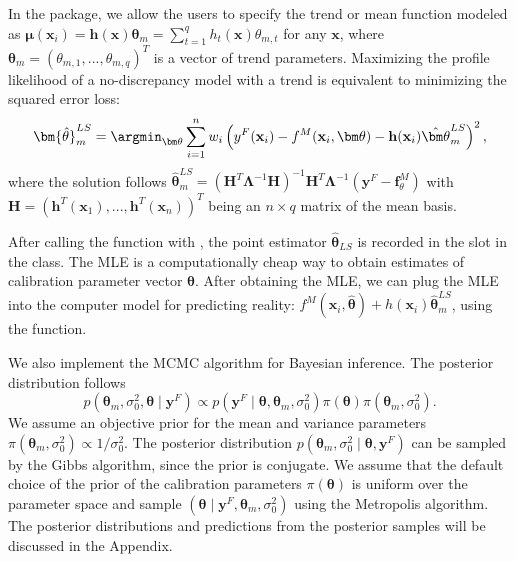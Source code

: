   In the  package, we allow the users to specify the trend or mean function modeled as $\bm \mu(\mathbf x_i)=  \mathbf h(\mathbf x) \bm \theta_{m}=\sum^q_{t=1}h_t(\mathbf x)  \theta_{m,t} $ for any $\mathbf x$, where $\bm \theta_{m}=(\theta_{m,1},...,\theta_{m,q})^T$ is a vector of trend parameters. Maximizing the profile likelihood of a no-discrepancy model with a trend is equivalent to minimizing the squared error loss: 
   \[ \bm {\hat \theta}^{LS}_{m}=\argmin_{\bm \theta}\sum^n_{i=1} w_i \left(y^F(\mathbf x_i)- f^M(\mathbf x_i, \bm \theta) - \mathbf h(\mathbf x_i)\hat {\bm \theta}^{LS}_m    \right)^2, \] 
where the solution follows $\hat {\bm \theta}^{LS}_{m}= (\mathbf H^T \bm \Lambda^{-1} \mathbf H)^{-1}\mathbf H^T \bm \Lambda^{-1}( \mathbf y^F-\mathbf f^M_{\theta})$ with   $\mathbf H=(\mathbf h^T(\mathbf x_1),..., \mathbf h^T(\mathbf x_n))^T$ being an $n\times q$ matrix of the mean basis.     
   
After calling the   function with , the point estimator $\bm {\hat \theta}_{LS}$ is recorded in the slot  in the  class.  The MLE is  a computationally cheap way to obtain estimates of calibration parameter vector $\bm \theta$.  After obtaining the MLE, we can plug the MLE into the computer model for predicting reality: $f^M(\mathbf x_i,  \bm {\hat \theta}) + h(\mathbf x_i)\hat {\bm \theta}^{LS}_m$, {using the  function}.

We also implement the MCMC algorithm for Bayesian inference.
The  posterior distribution follows 
\begin{equation}
p(\bm \theta_m, \sigma^2_0, \bm \theta\mid \mathbf y^F) \propto  p(\mathbf y^F \mid \bm \theta, {\bm  \theta_m},  \sigma^2_0 ) \pi(\bm \theta) \pi({\bm  \theta_m},  \sigma^2_0).
\label{equ:post}
\end{equation} 
We assume an objective prior for the mean and variance parameters $\pi(\bm \theta_m, \sigma^2_0)\propto 1/\sigma^2_0$.  The posterior distribution $p(\bm \theta_m, \sigma^2_0 \mid \bm \theta, \mathbf y^F)$ can be sampled by the Gibbs algorithm, since the prior is conjugate. We assume that the default choice of the prior of the calibration parameters $\pi(\bm \theta)$ is uniform over the parameter space and sample $(\bm \theta \mid \mathbf y^F,\bm \theta_m, \sigma^2_0)$  using the Metropolis algorithm. The posterior distributions and predictions from the posterior samples will be discussed in the Appendix. 


